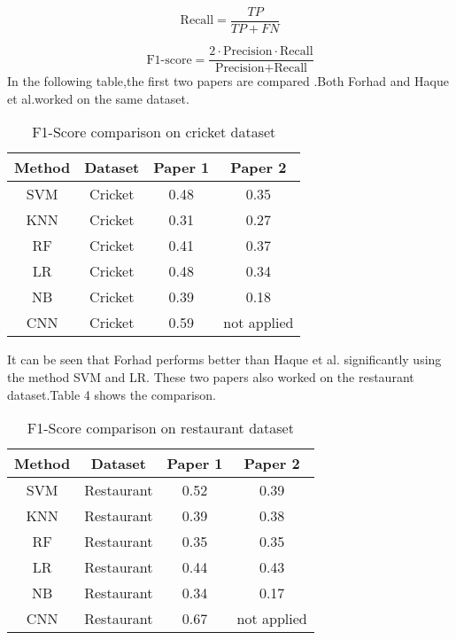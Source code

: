 \documentclass[a4paper,12pt]{article}
\begin{document}
\begin{equation}
\text{Recall} = \frac{TP}{TP + FN}
\end{equation}

\begin{equation}
\text{F1-score} = \frac{2 \cdot \text{Precision} \cdot \text{Recall}}{\text{Precision} + \text{Recall}}
\end{equation}
In the following table,the first two papers are compared .Both Forhad\cite{first} and Haque et al.\cite{second}worked on the same dataset.
\begin{table}[h!]
    \centering
    \begin{tabular}{|c|c|c|c|}
        \hline
        \textbf{Method} & \textbf{Dataset} & \textbf{Paper 1} & \textbf{Paper 2} \\
        \hline
        SVM & Cricket & 0.48 & 0.35 \\
        \hline
        KNN & Cricket & 0.31 & 0.27 \\
        \hline
        RF & Cricket & 0.41 & 0.37 \\
        \hline
        LR & Cricket& 0.48 & 0.34 \\
        \hline
        NB & Cricket & 0.39 & 0.18 \\
        \hline
        CNN & Cricket & 0.59 & not applied \\
        \hline
    \end{tabular}
    \caption{F1-Score comparison on cricket dataset}
    \label{tab:example}
\end{table}

It can be seen that Forhad\cite{first} performs better than Haque et al.\cite{second} significantly using the method SVM and LR.\newline
These two papers also worked on the restaurant dataset.Table 4 shows the comparison.
\begin{table}[h!]
    \centering
    \begin{tabular}{|c|c|c|c|}
        \hline
        \textbf{Method} & \textbf{Dataset} & \textbf{Paper 1} & \textbf{Paper 2} \\
        \hline
        SVM & Restaurant & 0.52 & 0.39 \\
        \hline
        KNN & Restaurant & 0.39 & 0.38 \\
        \hline
        RF & Restaurant & 0.35 & 0.35 \\
        \hline
        LR & Restaurant & 0.44 & 0.43 \\
        \hline
        NB & Restaurant & 0.34 & 0.17 \\
        \hline
        CNN & Restaurant & 0.67 & not applied \\
        \hline
    \end{tabular}
    \caption{F1-Score comparison on restaurant dataset}
    \label{tab:example}
\end{table}
\end{document}

